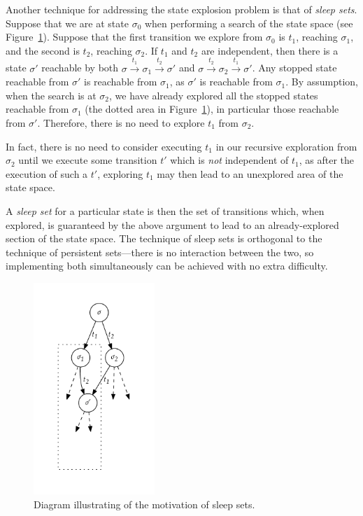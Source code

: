 \documentclass[12pt,a4paper,twoside,openright]{report}
\begin{document}
Another technique for addressing the state explosion
problem is that of \emph{sleep sets}. Suppose that
we are at state $\sigma_0$ when performing a search
of the state space (see Figure~\ref{fig:sleep}).
Suppose that the first transition
we explore from $\sigma_0$ is $t_1$, reaching $\sigma_1$,
and the second is $t_2$, reaching $\sigma_2$.
If $t_1$ and $t_2$ are independent, then there
is a state $\sigma'$ reachable by both
$\sigma \xrightarrow{t_1} \sigma_1
\xrightarrow{t_2} \sigma'$ and
$\sigma \xrightarrow{t_2} \sigma_2
\xrightarrow{t_1} \sigma'$.
Any stopped state reachable from $\sigma'$
is reachable from $\sigma_1$, as $\sigma'$
is reachable from $\sigma_1$. By assumption,
when the search is at $\sigma_2$, we have already
explored all the stopped states reachable from
$\sigma_1$ (the dotted area in Figure~\ref{fig:sleep}),
in particular those reachable from
$\sigma'$. Therefore, there is no need to
explore $t_1$ from $\sigma_2$.

In fact, there is no need to consider executing
$t_1$ in our recursive exploration from $\sigma_2$
until we execute some transition $t'$ which is
\emph{not} independent of $t_1$, as after
the execution of such a $t'$, exploring $t_1$ may
then lead to an unexplored area of the state space.

A \emph{sleep set} for a particular state
is then the set of transitions which, when
explored, is guaranteed by the above
argument to lead to an already-explored
section of the state space\footnotemark.
The technique of
sleep sets is orthogonal to the technique
of persistent sets---there is no interaction
between the two, so implementing
both simultaneously can be achieved with
no extra difficulty.

\begin{figure}
	\centering
	\includegraphics[height=8cm]{sleep}
	\caption{Diagram illustrating of the motivation
		of sleep sets.}
	\label{fig:sleep}
\end{figure}
\end{document}
